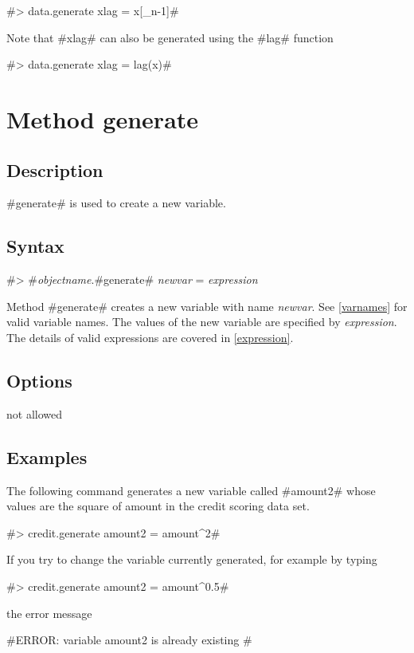 #> data.generate xlag = x[_n-1]#

\newpage

Note that #xlag# can also be generated using the #lag# function

#> data.generate xlag = lag(x)#


\section{Method generate}
\label{generate} 

\subsection*{Description}

#generate# is used to create a new variable.


\subsection*{Syntax}

#> #{\em objectname}.#generate# {\em newvar} = {\em expression}

Method #generate# creates a new variable with name {\em newvar}.
See \autoref{varnames} for valid variable names. The values of the
new variable are specified by {\em expression}. The details of
valid expressions are covered in \autoref{expression}.


\subsection*{Options}

not allowed


\subsection*{Examples}

The following command generates a new variable called #amount2#
whose values are the square of amount in the credit
scoring data set.

#> credit.generate amount2 = amount^2#

If you try to change the variable currently generated, for example by typing

#> credit.generate amount2 = amount^0.5#

the error message

#ERROR: variable amount2 is already existing #

